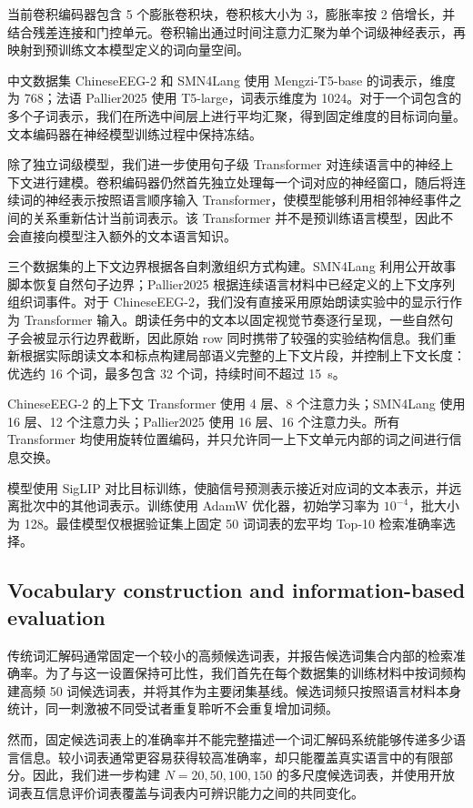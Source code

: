 当前卷积编码器包含 5 个膨胀卷积块，卷积核大小为 3，膨胀率按 2 倍增长，并结合残差连接和门控单元。卷积输出通过时间注意力汇聚为单个词级神经表示，再映射到预训练文本模型定义的词向量空间。

中文数据集 ChineseEEG-2 和 SMN4Lang 使用 Mengzi-T5-base 的词表示，维度为 768；法语 Pallier2025 使用 T5-large，词表示维度为 1024。对于一个词包含的多个子词表示，我们在所选中间层上进行平均汇聚，得到固定维度的目标词向量。文本编码器在神经模型训练过程中保持冻结。

除了独立词级模型，我们进一步使用句子级 Transformer 对连续语言中的神经上下文进行建模。卷积编码器仍然首先独立处理每一个词对应的神经窗口，随后将连续词的神经表示按照语言顺序输入 Transformer，使模型能够利用相邻神经事件之间的关系重新估计当前词表示。该 Transformer 并不是预训练语言模型，因此不会直接向模型注入额外的文本语言知识。

三个数据集的上下文边界根据各自刺激组织方式构建。SMN4Lang 利用公开故事脚本恢复自然句子边界；Pallier2025 根据连续语言材料中已经定义的上下文序列组织词事件。对于 ChineseEEG-2，我们没有直接采用原始朗读实验中的显示行作为 Transformer 输入。朗读任务中的文本以固定视觉节奏逐行呈现，一些自然句子会被显示行边界截断，因此原始 row 同时携带了较强的实验结构信息。我们重新根据实际朗读文本和标点构建局部语义完整的上下文片段，并控制上下文长度：优选约 16 个词，最多包含 32 个词，持续时间不超过 15~s。

ChineseEEG-2 的上下文 Transformer 使用 4 层、8 个注意力头；SMN4Lang 使用 16 层、12 个注意力头；Pallier2025 使用 16 层、16 个注意力头。所有 Transformer 均使用旋转位置编码，并只允许同一上下文单元内部的词之间进行信息交换。

模型使用 SigLIP 对比目标训练，使脑信号预测表示接近对应词的文本表示，并远离批次中的其他词表示。训练使用 AdamW 优化器，初始学习率为 $10^{-4}$，批大小为 128。最佳模型仅根据验证集上固定 50 词词表的宏平均 Top-10 检索准确率选择。

\subsection{Vocabulary construction and information-based evaluation}

传统词汇解码通常固定一个较小的高频候选词表，并报告候选词集合内部的检索准确率。为了与这一设置保持可比性，我们首先在每个数据集的训练材料中按词频构建高频 50 词候选词表，并将其作为主要闭集基线。候选词频只按照语言材料本身统计，同一刺激被不同受试者重复聆听不会重复增加词频。

然而，固定候选词表上的准确率并不能完整描述一个词汇解码系统能够传递多少语言信息。较小词表通常更容易获得较高准确率，却只能覆盖真实语言中的有限部分。因此，我们进一步构建 $N=20,50,100,150$ 的多尺度候选词表，并使用开放词表互信息评价词表覆盖与词表内可辨识能力之间的共同变化。

